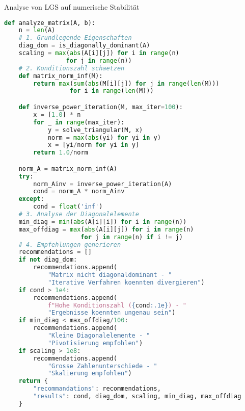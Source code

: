 \begin{examplecode}{Analyse von LGS auf numerische Stabilität}
\begin{lstlisting}[language=Python, style=basesmol]
def analyze_matrix(A, b):
    n = len(A)
    # 1. Grundlegende Eigenschaften
    diag_dom = is_diagonally_dominant(A)
    scaling = max(abs(A[i][j]) for i in range(n) 
                 for j in range(n))
    # 2. Konditionszahl schaetzen 
    def matrix_norm_inf(M):
        return max(sum(abs(M[i][j]) for j in range(len(M))) 
                  for i in range(len(M)))

    def inverse_power_iteration(M, max_iter=100):
        x = [1.0] * n
        for _ in range(max_iter):
            y = solve_triangular(M, x)
            norm = max(abs(yi) for yi in y)
            x = [yi/norm for yi in y]
        return 1.0/norm

    norm_A = matrix_norm_inf(A)
    try:
        norm_Ainv = inverse_power_iteration(A)
        cond = norm_A * norm_Ainv
    except:
        cond = float('inf')
    # 3. Analyse der Diagonalelemente
    min_diag = min(abs(A[i][i]) for i in range(n))
    max_offdiag = max(abs(A[i][j]) for i in range(n) 
                     for j in range(n) if i != j)
    # 4. Empfehlungen generieren
    recommendations = []
    if not diag_dom:
        recommendations.append(
            "Matrix nicht diagonaldominant - "
            "Iterative Verfahren koennten divergieren")
    if cond > 1e4:
        recommendations.append(
            f"Hohe Konditionszahl ({cond:.1e}) - "
            "Ergebnisse koennten ungenau sein")
    if min_diag < max_offdiag/100:
        recommendations.append(
            "Kleine Diagonalelemente - "
            "Pivotisierung empfohlen")
    if scaling > 1e8:
        recommendations.append(
            "Grosse Zahlenunterschiede - "
            "Skalierung empfohlen")
    return {
        "recommandations": recommendations, 
        "results": cond, diag_dom, scaling, min_diag, max_offdiag
    }
\end{lstlisting}
\end{examplecode}

